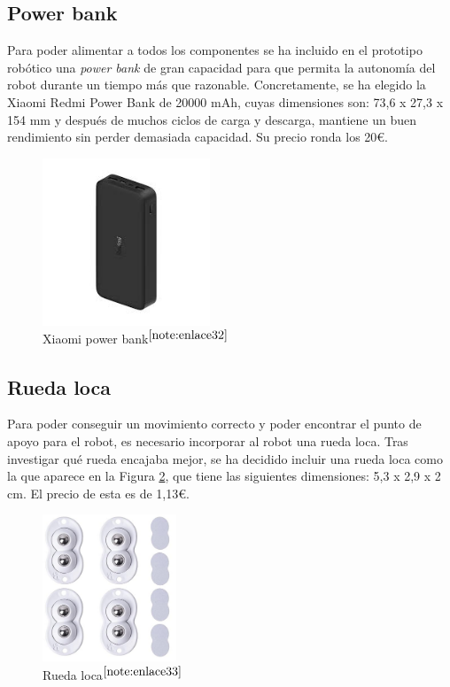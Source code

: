 \subsection{Power bank}
\label{subsec:powerbank}

Para poder alimentar a todos los componentes se ha incluido en el prototipo robótico una \textit{power bank} de gran capacidad para que permita la autonomía del robot durante un tiempo más que razonable. Concretamente, se ha elegido la Xiaomi Redmi Power Bank de 20000 mAh, cuyas dimensiones son: 73,6 x 27,3 x 154 mm y después de muchos ciclos de carga y descarga, mantiene un buen rendimiento sin perder demasiada capacidad. Su precio ronda los 20€. %

\begin{figure} [h!]
	\begin{center}
		\includegraphics[width=5cm]{figs/powerbank.png}
	\end{center}
	\caption{Xiaomi power bank$^{\ref{note:enlace32}}$} 
	\label{fig:powerbank}
\end{figure}

\setcounter{footnote}{32} %

\subsection{Rueda loca}
\label{subsec:ruedaloca}

Para poder conseguir un movimiento correcto y poder encontrar el punto de apoyo para el robot, es necesario incorporar al robot una rueda loca. Tras investigar qué rueda encajaba mejor, se ha decidido incluir una rueda loca como la que aparece en la Figura \ref{fig:ruedaloca}, que tiene las siguientes dimensiones: 5,3 x 2,9 x 2 cm. El precio de esta es de 1,13€.

\begin{figure} [h!]
	\begin{center}
		\includegraphics[width=4cm]{figs/ruedaloca.png}
	\end{center}
	\caption{Rueda loca$^{\ref{note:enlace33}}$} 
	\label{fig:ruedaloca}
\end{figure}

